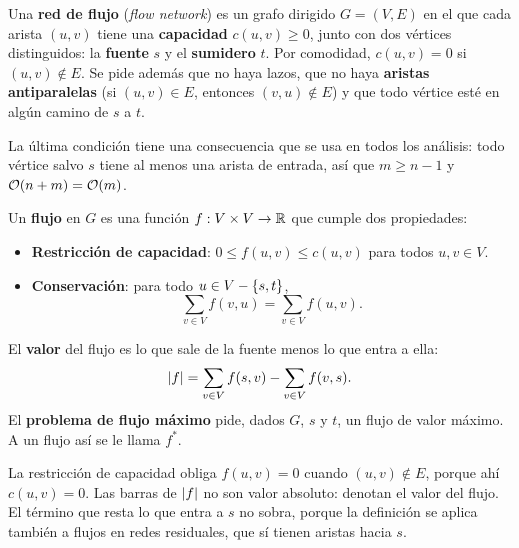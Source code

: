 \documentclass[11pt,letterpaper]{article}
\begin{document}
\begin{definicion}
  Una \textbf{red de flujo} (\textit{flow network}) es un grafo
  dirigido $G = (V, E)$ en el que cada arista $(u, v)$ tiene una
  \textbf{capacidad} $c(u, v) \ge 0$, junto con dos vértices
  distinguidos: la \textbf{fuente} $s$ y el \textbf{sumidero} $t$. Por
  comodidad, $c(u, v) = 0$ si $(u, v) \notin E$. Se pide además que no
  haya lazos, que no haya \textbf{aristas antiparalelas} (si
  $(u, v) \in E$, entonces $(v, u) \notin E$) y que todo vértice esté
  en algún camino de $s$ a $t$.
\end{definicion}

La última condición tiene una consecuencia que se usa en todos los
análisis: todo vértice salvo $s$ tiene al menos una arista de entrada,
así que $m \ge n - 1$ y $\mathcal{O}\!\left(n + m\right) = \mathcal{O}\!\left(m\right)$.

\begin{definicion}[Flujo]
  Un \textbf{flujo} en $G$ es una función $f : V \times V \to \mathbb{R}$ que
  cumple dos propiedades:
  \begin{itemize}
    \item \textbf{Restricción de capacidad}: $0 \le f(u, v) \le
          c(u, v)$ para todos $u, v \in V$.
    \item \textbf{Conservación}: para todo $u \in V - \left\{ s, t \right\}$,
          \[
            \sum_{v \in V} f(v, u) = \sum_{v \in V} f(u, v) .
          \]
  \end{itemize}
  El \textbf{valor} del flujo es lo que sale de la fuente menos lo que
  entra a ella:
  \[
    \left\lvert f \right\rvert = \sum_{v \in V} f(s, v) - \sum_{v \in V} f(v, s) .
  \]
  El \textbf{problema de flujo máximo} pide, dados $G$, $s$ y $t$, un
  flujo de valor máximo. A un flujo así se le llama $f^*$.
\end{definicion}

La restricción de capacidad obliga $f(u, v) = 0$ cuando
$(u, v) \notin E$, porque ahí $c(u, v) = 0$. Las barras de $\left\lvert f \right\rvert$
no son valor absoluto: denotan el valor del flujo. El término que
resta lo que entra a $s$ no sobra, porque la definición se aplica
también a flujos en redes residuales, que sí tienen aristas hacia $s$.
\end{document}
